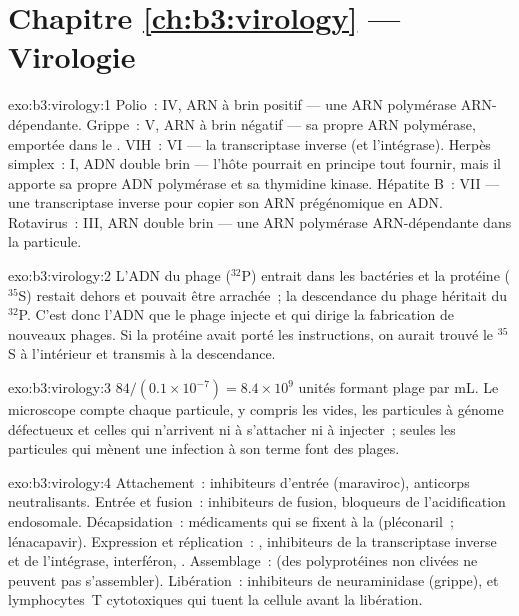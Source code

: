 \section*{Chapitre \ref{ch:b3:virology} --- Virologie}

\begin{solution}{exo:b3:virology:1}
Polio~: IV, ARN à brin positif --- une ARN polymérase ARN-dépendante.
Grippe~: V, ARN à brin négatif --- sa propre ARN polymérase, emportée
dans le . VIH~: VI --- la transcriptase inverse (et
l'intégrase). Herpès simplex~: I, ADN double brin --- l'hôte pourrait
en principe tout fournir, mais il apporte sa propre ADN polymérase et
sa thymidine kinase. Hépatite B~: VII --- une transcriptase inverse
pour copier son ARN prégénomique en ADN. Rotavirus~: III, ARN double
brin --- une ARN polymérase ARN-dépendante dans la particule.
\end{solution}

\begin{solution}{exo:b3:virology:2}
L'ADN du phage ($^{32}$P) entrait dans les bactéries et la protéine
($^{35}$S) restait dehors et pouvait être arrachée~; la descendance du
phage héritait du $^{32}$P. C'est donc l'ADN que le phage injecte et
qui dirige la fabrication de nouveaux phages. Si la protéine avait
porté les instructions, on aurait trouvé le $^{35}$S à l'intérieur et
transmis à la descendance.
\end{solution}

\begin{solution}{exo:b3:virology:3}
$84/(0.1\times 10^{-7}) = 8.4\times 10^{9}$ unités formant plage par
mL. Le microscope compte chaque particule, y compris les 
vides, les particules à génome défectueux et celles qui n'arrivent ni à
s'attacher ni à injecter~; seules les particules qui mènent une
infection à son terme font des plages.
\end{solution}

\begin{solution}{exo:b3:virology:4}
Attachement~: inhibiteurs d'entrée (maraviroc), anticorps
neutralisants. Entrée et fusion~: inhibiteurs de fusion, bloqueurs de
l'acidification endosomale. Décapsidation~: médicaments qui se fixent à
la  (pléconaril~; lénacapavir). Expression et réplication~:
, inhibiteurs de la transcriptase inverse et de
l'intégrase, interféron, . Assemblage~:  (des polyprotéines non clivées ne peuvent pas s'assembler).
Libération~: inhibiteurs de neuraminidase (grippe), et lymphocytes~T
cytotoxiques qui tuent la cellule avant la libération.
\end{solution}

